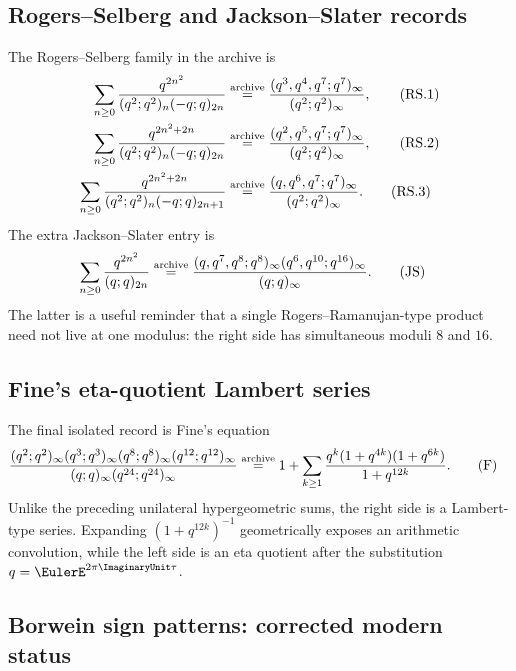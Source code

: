 \documentclass[11pt,oneside]{article}
\theoremstyle{definition}
\begin{document}
\subsection{Rogers--Selberg and Jackson--Slater records}

The Rogers--Selberg family in the archive is
\begin{align*}
 \sum_{n\ge0}\frac{q^{2n^2}}
 {(q^2;q^2)_n(-q;q)_{2n}}
 &\mathrel{\stackrel{\rm archive}{=}}
 \frac{(q^3,q^4,q^7;q^7)_\infty}{(q^2;q^2)_\infty},
 \tag{RS.1}\label{eq:atlas-rs-1}\\
 \sum_{n\ge0}\frac{q^{2n^2+2n}}
 {(q^2;q^2)_n(-q;q)_{2n}}
 &\mathrel{\stackrel{\rm archive}{=}}
 \frac{(q^2,q^5,q^7;q^7)_\infty}{(q^2;q^2)_\infty},
 \tag{RS.2}\label{eq:atlas-rs-2}\\
 \sum_{n\ge0}\frac{q^{2n^2+2n}}
 {(q^2;q^2)_n(-q;q)_{2n+1}}
 &\mathrel{\stackrel{\rm archive}{=}}
 \frac{(q,q^6,q^7;q^7)_\infty}{(q^2;q^2)_\infty}.
 \tag{RS.3}\label{eq:atlas-rs-3}
\end{align*}
The extra Jackson--Slater entry is
\begin{align*}
 \sum_{n\ge0}\frac{q^{2n^2}}{(q;q)_{2n}}
 &\mathrel{\stackrel{\rm archive}{=}}
 \frac{(q,q^7,q^8;q^8)_\infty
       (q^6,q^{10};q^{16})_\infty}
 {(q;q)_\infty}.
 \tag{JS}\label{eq:atlas-js}
\end{align*}
The latter is a useful reminder that a single Rogers--Ramanujan-type product
need not live at one modulus: the right side has simultaneous moduli $8$ and
$16$.

\subsection{Fine's eta-quotient Lambert series}

The final isolated record is Fine's equation
\begin{align*}
 &\frac{(q^2;q^2)_\infty(q^3;q^3)_\infty
        (q^8;q^8)_\infty(q^{12};q^{12})_\infty}
       {(q;q)_\infty(q^{24};q^{24})_\infty}
 \mathrel{\stackrel{\rm archive}{=}}
 1+\sum_{k\ge1}
 \frac{q^k(1+q^{4k})(1+q^{6k})}{1+q^{12k}}.
 \tag{F}\label{eq:atlas-fine}
\end{align*}
Unlike the preceding unilateral hypergeometric sums, the right side is a
Lambert-type series.  Expanding $(1+q^{12k})^{-1}$ geometrically exposes an
arithmetic convolution, while the left side is an eta quotient after the
substitution $q=\EulerE^{2\pi\ImaginaryUnit\tau}$.

\subsection{Borwein sign patterns: corrected modern status}
\label{subsec:borwein-status}
\end{document}
